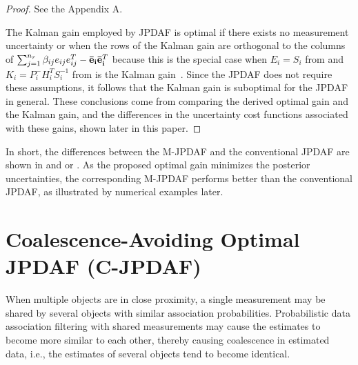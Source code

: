 \begin{proof}
See the Appendix A.

The Kalman gain employed by JPDAF is optimal if there exists no measurement uncertainty or when the rows of the Kalman gain are orthogonal to the columns of $\sum_{j=1}^{n_r}\beta_{ij}e_{ij}e_{ij}^T-{\bf\bar{e}_i}{\bf\bar{e}_i}^T$ because this is the special case when $E_i=S_i$ from  and $K_i=P^-_iH_i^TS_i^{-1}$ from  is the Kalman gain~\cite{OptEst1}.
Since the JPDAF does not require these assumptions, it follows that the Kalman gain is suboptimal for the JPDAF in general.
These conclusions come from comparing the derived optimal gain and the Kalman gain, and the differences in the uncertainty cost functions associated with these gains, shown later in this paper.

%
%
\end{proof}


In short, the differences between the M-JPDAF and the conventional JPDAF are shown in  and  or .
As the proposed optimal gain minimizes the posterior uncertainties, the corresponding M-JPDAF performs better than the conventional JPDAF, as illustrated by numerical examples later.


\section{Coalescence-Avoiding Optimal JPDAF (C-JPDAF)}
\label{sec:C-JPDAF}




When multiple objects are in close proximity, a single measurement may be shared by several objects with similar association probabilities.
Probabilistic data association filtering with shared measurements may cause the estimates to become more similar to each other, thereby causing coalescence in estimated data, i.e., the estimates of several objects tend to become identical.


